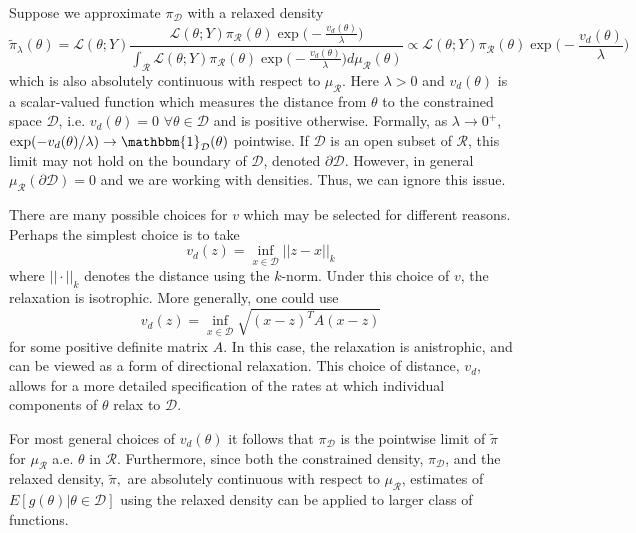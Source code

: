 \documentclass[12 point]{article}
\begin{document}
Suppose we approximate $\pi_\mathcal{D}$ with a relaxed density $$\tilde{\pi}_\lambda(\theta) = \mathcal{L}(\theta; Y) \frac{\mathcal{L}(\theta; Y)\pi_\mathcal{R}(\theta)\exp\big(-\frac{v_d(\theta)}{\lambda}\big)}{\int_{\mathcal{R}}\mathcal{L}(\theta; Y) \pi_\mathcal{R}(\theta)\exp\big(-\frac{v_d(\theta)}{\lambda}\big) d\mu_\mathcal{R}(\theta)} \propto \mathcal{L}(\theta; Y) \pi_\mathcal{R}(\theta)\exp\big(-\frac{v_d(\theta)}{\lambda}\big)$$
which is also absolutely continuous with respect to $\mu_\mathcal{R}.$
Here $\lambda >0$ and $v_d(\theta)$ is a scalar-valued function which measures the distance from $\theta$ to the constrained space $\mathcal{D}$, i.e. $v_d(\theta) = 0 $ $\forall \theta \in \mathcal{D}$ and is positive otherwise.  Formally, as $\lambda \to 0^+$, $\exp(-v_d(\theta)/\lambda) \to \mathbbm{1}_\mathcal{D}(\theta)$ pointwise.  If $\mathcal{D}$ is an open subset of $\mathcal{R}$, this limit may not hold on the boundary of $\mathcal{D}$, denoted $\partial \mathcal{D}$.  However, in general $\mu_\mathcal{R}(\partial \mathcal{D}) = 0$ and we are working with densities. Thus, we can ignore this issue.

There are many possible choices for $v$ which may be selected for different reasons.  Perhaps the simplest choice is to take
\begin{equation}
\label{EQ:Isotrophic_relaxation}
v_d(z) =  \inf_{x\in\mathcal{D}} ||z-x||_k
\end{equation}
where $||\cdot||_k$ denotes the distance using the $k$-norm. Under this choice of $v$, the relaxation is isotrophic. More generally, one could use
\begin{equation}
v_d(z) = \inf_{x\in\mathcal{D}} \sqrt{(x-z)^T A (x-z)}\label{EQ:anistrophic_relaxation}
\end{equation} for some positive definite matrix $A$. In this case, the relaxation is anistrophic, and can be viewed as a form of directional relaxation. This choice of distance, $v_d$, allows for a more detailed specification of the rates at which individual components of $\theta$ relax to $\mathcal{D}$.  

For most general choices of $v_d(\theta)$ it follows that $\pi_\mathcal{D}$ is the pointwise limit of $\tilde{\pi}$ for $\mu_\mathcal{R}$ a.e. $\theta$ in $\mathcal{R}.$  Furthermore, since both the constrained density, $\pi_\mathcal{D}$, and the relaxed density, $\tilde{\pi},$ are absolutely continuous with respect to $\mu_\mathcal{R}$, estimates of $E[g(\theta)|\theta\in\mathcal{D}]$ using the relaxed density can be applied to larger class of functions.
\end{document}
